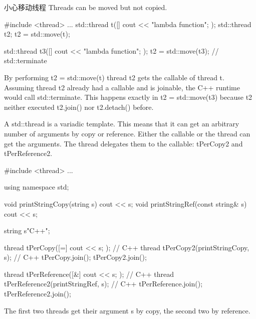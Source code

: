 \begin{myWarning}{小心移动线程}
Threads can be moved but not copied.

\begin{cpp}
#include <thread>
...
std::thread t([]{ cout << "lambda function"; });
std::thread t2;
t2 = std::move(t);

std::thread t3([]{ cout << "lambda function"; });
t2 = std::move(t3); // std::terminate
\end{cpp}

By performing t2 = std::move(t) thread t2 gets the callable of thread t. Assuming thread t2 already had a callable and is joinable, the C++ runtime would call std::terminate. This happens exactly in t2 = std::move(t3) because t2 neither executed t2.join() nor t2.detach() before.
\end{myWarning}


A std::thread is a variadic template. This means that it can get an arbitrary number of arguments by copy or reference. Either the callable or the thread can get the arguments. The thread delegates them to the callable: tPerCopy2 and tPerReference2.

\begin{cpp}
#include <thread>
...

using namespace std;

void printStringCopy(string s){ cout << s; }
void printStringRef(const string& s){ cout << s; }

string s{"C++"};

thread tPerCopy([=]{ cout << s; }); // C++
thread tPerCopy2(printStringCopy, s); // C++
tPerCopy.join();
tPerCopy2.join();

thread tPerReference([&]{ cout << s; }); // C++
thread tPerReference2(printStringRef, s); // C++
tPerReference.join();
tPerReference2.join();
\end{cpp}

The first two threads get their argument s by copy, the second two by reference.

